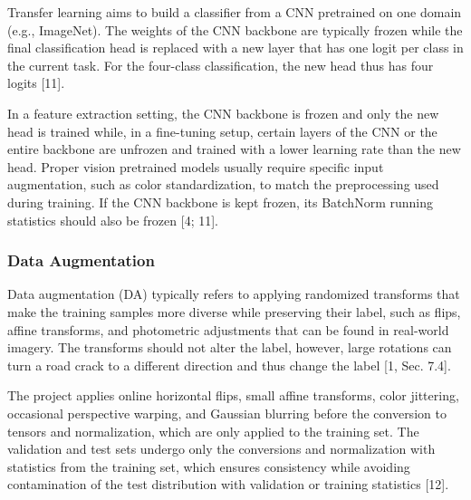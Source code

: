 \documentclass[11pt,a4paper]{article}
\begin{document}
Transfer learning aims to build a classifier from a CNN pretrained on one domain (e.g., ImageNet). The weights of the CNN backbone are typically frozen while the final classification head is replaced with a new layer that has one logit per class in the current task. For the four-class classification, the new head thus has four logits [11].

In a feature extraction setting, the CNN backbone is frozen and only the new head is trained while, in a fine-tuning setup, certain layers of the CNN or the entire backbone are unfrozen and trained with a lower learning rate than the new head. Proper vision pretrained models usually require specific input augmentation, such as color standardization, to match the preprocessing used during training. If the CNN backbone is kept frozen, its BatchNorm running statistics should also be frozen [4; 11].

\subsubsection{Data Augmentation}\label{theory:2.6.2}

Data augmentation (DA) typically refers to applying randomized transforms that make the training samples more diverse while preserving their label, such as flips, affine transforms, and photometric adjustments that can be found in real-world imagery. The transforms should not alter the label, however, large rotations can turn a road crack to a different direction and thus change the label [1, Sec. 7.4].

The project applies online horizontal flips, small affine transforms, color jittering, occasional perspective warping, and Gaussian blurring before the conversion to tensors and normalization, which are only applied to the training set. The validation and test sets undergo only the conversions and normalization with statistics from the training set, which ensures consistency while avoiding contamination of the test distribution with validation or training statistics [12].
\end{document}

